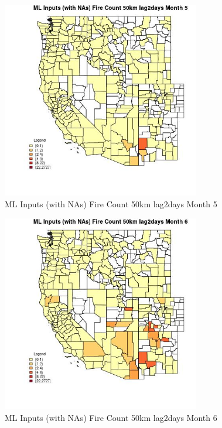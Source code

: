 \begin{figure} 
\centering  
\includegraphics[width=0.77\textwidth]{Code_Outputs/Report_ML_input_PM25_Step4_part_f_de_duplicated_aves_prioritize_24hr_obswNAs_CountyFire_Count_50km_lag2daysmedianMonth5.jpg} 
\caption{\label{fig:Report_ML_input_PM25_Step4_part_f_de_duplicated_aves_prioritize_24hr_obswNAsCountyFire_Count_50km_lag2daysmedianMonth5}ML Inputs (with NAs) Fire Count 50km lag2days Month 5} 
\end{figure} 
 

\begin{figure} 
\centering  
\includegraphics[width=0.77\textwidth]{Code_Outputs/Report_ML_input_PM25_Step4_part_f_de_duplicated_aves_prioritize_24hr_obswNAs_CountyFire_Count_50km_lag2daysmedianMonth6.jpg} 
\caption{\label{fig:Report_ML_input_PM25_Step4_part_f_de_duplicated_aves_prioritize_24hr_obswNAsCountyFire_Count_50km_lag2daysmedianMonth6}ML Inputs (with NAs) Fire Count 50km lag2days Month 6} 
\end{figure} 
 

